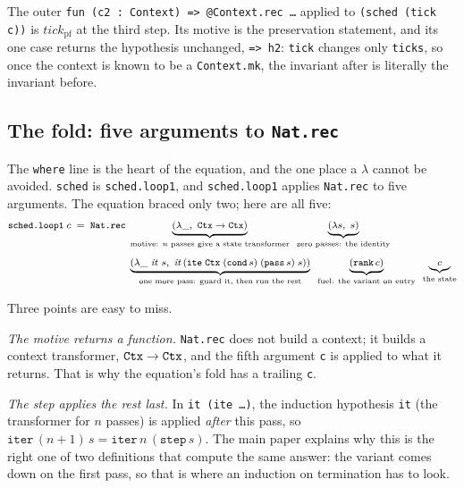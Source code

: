 \documentclass[11pt]{article}
\newcommand{\code}[1]{\texttt{#1}}
\begin{document}


The outer \code{fun (c2 : Context) => @Context.rec \ldots} applied to
\code{(sched (tick c))} is $\mathit{tick}_{\mathrm{pf}}$ at the third step.
Its motive is the preservation statement, and its one case returns the
hypothesis unchanged, \code{=> h2}: \code{tick} changes only \code{ticks}, so
once the context is known to be a \code{Context.mk}, the invariant after is
literally the invariant before.

\subsection{The fold: five arguments to \texorpdfstring{\code{Nat.rec}}{Nat.rec}}
\label{sec:fold}

The \code{where} line is the heart of the equation, and the one place a
$\lambda$ cannot be avoided. \code{sched} is \code{sched.loop1}, and
\code{sched.loop1} applies \code{Nat.rec} to five arguments. The equation
braced only two; here are all five:
\begin{equation}
\label{eq:fold}
\footnotesize
\begin{aligned}
\code{sched.loop1}\;c \;=\;
\code{Nat.rec}\;
&\underbrace{(\lambda \_,\ \ctx \to \ctx)}_{\text{motive: }n\text{ passes give a state transformer}}\;\;
\underbrace{(\lambda s,\ s)}_{\text{zero passes: the identity}}
\\[1ex]
&\underbrace{(\lambda \_\ \mathit{it}\ s,\ \mathit{it}\,(\code{ite}\;\ctx\;(\code{cond}\,s)\;(\code{pass}\,s)\;s))}_{\text{one more pass: guard it, then run the rest}}\;\;
\underbrace{(\code{rank}\,c)}_{\text{fuel: the variant on entry}}\;\;
\underbrace{c}_{\text{the state}}
\end{aligned}
\end{equation}

Three points are easy to miss.

\emph{The motive returns a function.} \code{Nat.rec} does not build a
context; it builds a context transformer, $\ctx \to \ctx$, and the fifth
argument \code{c} is applied to what it returns. That is why the equation's
fold has a trailing \code{c}.

\emph{The step applies the rest last.} In \code{it (ite \ldots)}, the
induction hypothesis \code{it} (the transformer for $n$ passes) is applied
\emph{after} this pass, so $\code{iter}\,(n{+}1)\,s = \code{iter}\,n\,(\code{step}\,s)$.
The main paper explains why this is the right one of two definitions that
compute the same answer: the variant comes down on the first pass, so that is
where an induction on termination has to look.
\end{document}
